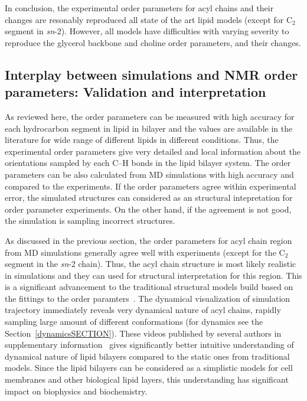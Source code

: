 \documentclass[aps,prl,superscriptaddress,twocolumn]{revtex4}
\begin{document}
In conclusion, the experimental order parameters for acyl chains and their changes are resonably
reproduced all state of the art lipid models (except for C$_2$ segment in {\it sn}-2).
However, all models have difficulties with varying severity to reproduce the glycerol backbone
and choline order parameters, and their changes.



\subsection{Interplay between simulations and NMR order parameters: Validation and interpretation}

As reviewed here, the order parameters can be measured with high accuracy for each hydrocarbon segment in lipid
in bilayer and the values are available in the literature for wide range of different lipids in different conditions.
Thus, the experimental order parameters give very detailed and local information about the orientations
sampled by each C--H bonds in the lipid bilayer system. The order parameters can 
be also calculated from MD simulations with high accuracy and compared to the experiments.
If the order parameters agree within experimental error, the simulated structures can considered as
an structural intepretation for order parameter experiments. On the other hand, if the agreement is not good, 
the simulation is sampling incorrect structures.

As discussed in the previous section, the order parameters for acyl chain region from MD simulations generally 
agree well with experiments (except for the C$_2$ segment in the {\it sn}-2 chain). Thus, the acyl chain structure 
is most likely realistic in simulations and they can used for structural interpretation for this region. 
This is a significant advancement to the traditional structural models build based on the 
fittings to the order paramters~\cite{seelig74,schindler75,seelig78,baenziger91}. The dynamical visualization of simulation trajectory immediately 
reveals very dynamical nature of acyl chains, rapidly sampling large amount of different conformations 
(for dynamics see the Section~\ref{dynamicsSECTION}). These videos published by several authors in supplementary information~\cite{??}
gives significantly better intuitive understanding of dynamical nature of lipid bilayers compared to the static ones from 
traditional models. Since the lipid bilayers can be considered as a simplistic models for cell
membranes and other biological lipid layers, this understanding has significant impact on
biophysics and biochemistry. 
\end{document}
